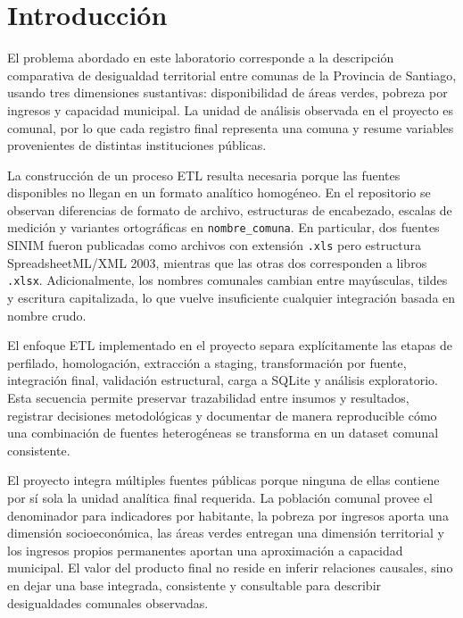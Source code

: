 \chapter{Introducción}

El problema abordado en este laboratorio corresponde a la descripción comparativa de desigualdad territorial entre comunas de la Provincia de Santiago, usando tres dimensiones sustantivas: disponibilidad de áreas verdes, pobreza por ingresos y capacidad municipal. La unidad de análisis observada en el proyecto es comunal, por lo que cada registro final representa una comuna y resume variables provenientes de distintas instituciones públicas.

La construcción de un proceso ETL resulta necesaria porque las fuentes disponibles no llegan en un formato analítico homogéneo. En el repositorio se observan diferencias de formato de archivo, estructuras de encabezado, escalas de medición y variantes ortográficas en \texttt{nombre\_comuna}. En particular, dos fuentes SINIM fueron publicadas como archivos con extensión \texttt{.xls} pero estructura SpreadsheetML/XML 2003, mientras que las otras dos corresponden a libros \texttt{.xlsx}. Adicionalmente, los nombres comunales cambian entre mayúsculas, tildes y escritura capitalizada, lo que vuelve insuficiente cualquier integración basada en nombre crudo.

El enfoque ETL implementado en el proyecto separa explícitamente las etapas de perfilado, homologación, extracción a staging, transformación por fuente, integración final, validación estructural, carga a SQLite y análisis exploratorio. Esta secuencia permite preservar trazabilidad entre insumos y resultados, registrar decisiones metodológicas y documentar de manera reproducible cómo una combinación de fuentes heterogéneas se transforma en un dataset comunal consistente.

El proyecto integra múltiples fuentes públicas porque ninguna de ellas contiene por sí sola la unidad analítica final requerida. La población comunal provee el denominador para indicadores por habitante, la pobreza por ingresos aporta una dimensión socioeconómica, las áreas verdes entregan una dimensión territorial y los ingresos propios permanentes aportan una aproximación a capacidad municipal. El valor del producto final no reside en inferir relaciones causales, sino en dejar una base integrada, consistente y consultable para describir desigualdades comunales observadas.
